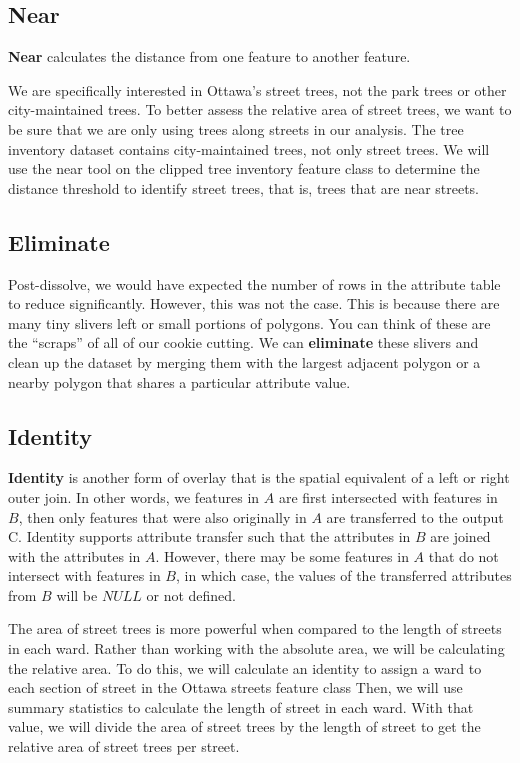 \documentclass[
]{book}
\begin{document}
\hypertarget{near}{%
\subsection{Near}\label{near}}

\textbf{Near} calculates the distance from one feature to another feature.

We are specifically interested in Ottawa's street trees, not the park trees or other city-maintained trees. To better assess the relative area of street trees, we want to be sure that we are only using trees along streets in our analysis. The tree inventory dataset contains city-maintained trees, not only street trees. We will use the near tool on the clipped tree inventory feature class to determine the distance threshold to identify street trees, that is, trees that are near streets.

\hypertarget{eliminate}{%
\subsection{Eliminate}\label{eliminate}}

Post-dissolve, we would have expected the number of rows in the attribute table to reduce significantly. However, this was not the case. This is because there are many tiny slivers left or small portions of polygons. You can think of these are the ``scraps'' of all of our cookie cutting. We can \textbf{eliminate} these slivers and clean up the dataset by merging them with the largest adjacent polygon or a nearby polygon that shares a particular attribute value.

\hypertarget{identity}{%
\subsection{Identity}\label{identity}}

\textbf{Identity} is another form of overlay that is the spatial equivalent of a left or right outer join. In other words, we features in \(A\) are first intersected with features in \(B\), then only features that were also originally in \(A\) are transferred to the output C. Identity supports attribute transfer such that the attributes in \(B\) are joined with the attributes in \(A\). However, there may be some features in \(A\) that do not intersect with features in \(B\), in which case, the values of the transferred attributes from \(B\) will be \(NULL\) or not defined.

The area of street trees is more powerful when compared to the length of streets in each ward. Rather than working with the absolute area, we will be calculating the relative area. To do this, we will calculate an identity to assign a ward to each section of street in the Ottawa streets feature class Then, we will use summary statistics to calculate the length of street in each ward. With that value, we will divide the area of street trees by the length of street to get the relative area of street trees per street.
\end{document}
